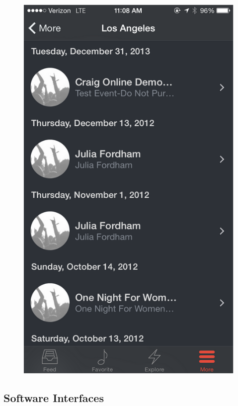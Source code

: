 \begin{figure}
\begin{minipage}{.5\textwidth}
        		\includegraphics[width=.7\linewidth]{./pics/app8.png}
        	\end{minipage}
        \end{figure}		

	\newpage
	\subsection{Software Interfaces}
